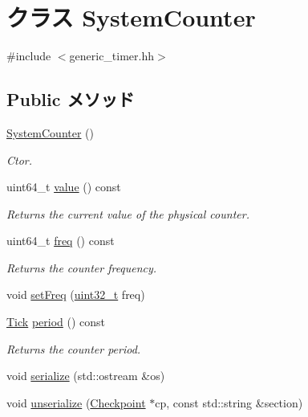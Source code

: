 \hypertarget{classGenericTimer_1_1SystemCounter}{
\section{クラス SystemCounter}
\label{classGenericTimer_1_1SystemCounter}
}


{\ttfamily \#include $<$generic\_\-timer.hh$>$}\subsection*{Public メソッド}
\begin{DoxyCompactItemize}
\item 
\hyperlink{classGenericTimer_1_1SystemCounter_aa4747e677bcc91e4b46002512732f203}{SystemCounter} ()
\begin{DoxyCompactList}\small\item\em Ctor. \item\end{DoxyCompactList}\item 
uint64\_\-t \hyperlink{classGenericTimer_1_1SystemCounter_a22d235cc68f1573b7db58a6f13756797}{value} () const 
\begin{DoxyCompactList}\small\item\em Returns the current value of the physical counter. \item\end{DoxyCompactList}\item 
uint64\_\-t \hyperlink{classGenericTimer_1_1SystemCounter_a00e7a4566af18a56108947d8c929c0e3}{freq} () const 
\begin{DoxyCompactList}\small\item\em Returns the counter frequency. \item\end{DoxyCompactList}\item 
void \hyperlink{classGenericTimer_1_1SystemCounter_a3b94395b3dcff3869dd1f0a376d7eb65}{setFreq} (\hyperlink{Type_8hh_a435d1572bf3f880d55459d9805097f62}{uint32\_\-t} freq)
\item 
\hyperlink{base_2types_8hh_a5c8ed81b7d238c9083e1037ba6d61643}{Tick} \hyperlink{classGenericTimer_1_1SystemCounter_a03f23d1f4180d4c5fe907543679ca146}{period} () const 
\begin{DoxyCompactList}\small\item\em Returns the counter period. \item\end{DoxyCompactList}\item 
void \hyperlink{classGenericTimer_1_1SystemCounter_a53e036786d17361be4c7320d39c99b84}{serialize} (std::ostream \&os)
\item 
void \hyperlink{classGenericTimer_1_1SystemCounter_af22e5d6d660b97db37003ac61ac4ee49}{unserialize} (\hyperlink{classCheckpoint}{Checkpoint} $\ast$cp, const std::string \&section)
\end{DoxyCompactItemize}
